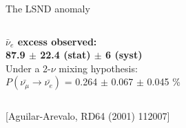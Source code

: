 \begin{frame}[t]{The LSND anomaly}
\begin{columns}
\begin{column}{0.50\textwidth}
{\begin{itemize}
{    }
    \end{itemize}
    \vspace{0.1cm}
    {\centering
      {\bf $\bar{\nu}_{e}$ excess observed:}\\
         {\bf \color{red}87.9 $\pm$ 22.4 (stat) $\pm$ 6 (syst)}\\
      \vspace{0.1cm}
      Under a 2-$\nu$ mixing hypothesis:\\
      {\color{red}$P(\bar{\nu_{\mu}} \rightarrow \bar{\nu_{e}})$ = 0.264  $\pm$ 0.067  $\pm$ 0.045 \%} \\
    }
  }
  \end{column}
\end{columns}
\begin{center}
 {\scriptsize \color{blue}[Aguilar-Arevalo, RD64 (2001) 112007]}\\
\end{center}
\end{frame}


%
%
%

